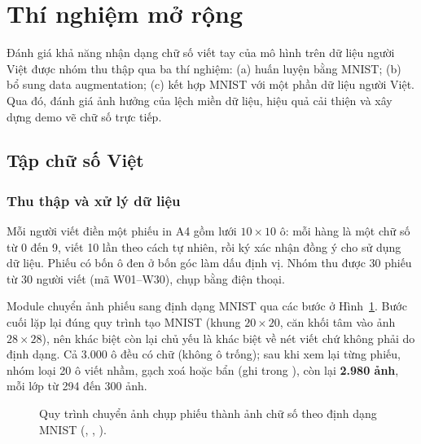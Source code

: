 \section{Thí nghiệm mở rộng}
Đánh giá khả năng nhận dạng chữ số viết tay của mô hình trên dữ liệu người Việt được nhóm thu thập qua ba thí nghiệm: (a) huấn luyện bằng MNIST; (b) bổ sung data augmentation; (c) kết hợp MNIST với một phần dữ liệu người Việt. Qua đó, đánh giá ảnh hưởng của lệch miền dữ liệu, hiệu quả cải thiện và xây dựng demo vẽ chữ số trực tiếp.
\subsection{Tập chữ số Việt}
\subsubsection{Thu thập và xử lý dữ liệu}
Mỗi người viết điền một phiếu in A4 gồm lưới $10\times10$ ô: mỗi hàng là một chữ số từ 0 đến 9, viết 10 lần theo cách tự nhiên, rồi ký xác nhận đồng ý cho sử dụng dữ liệu. Phiếu có bốn ô đen ở bốn góc làm dấu định vị. Nhóm thu được 30 phiếu từ 30 người viết (mã W01--W30), chụp bằng điện thoại.

Module  chuyển ảnh phiếu sang định dạng MNIST qua các bước ở Hình~\ref{fig:vnpipe}. Bước cuối lặp lại đúng quy trình tạo MNIST (khung $20\times20$, căn khối tâm vào ảnh $28\times28$), nên khác biệt còn lại chủ yếu là khác biệt về nét viết chứ không phải do định dạng. Cả 3.000 ô đều có chữ (không ô trống); sau khi xem lại từng phiếu, nhóm loại 20 ô viết nhầm, gạch xoá hoặc bẩn (ghi trong ), còn lại \textbf{2.980 ảnh}, mỗi lớp từ 294 đến 300 ảnh.

\begin{figure}[H]
\centering
{}
\caption{Quy trình chuyển ảnh chụp phiếu thành ảnh chữ số theo định dạng MNIST (, , ).}
\label{fig:vnpipe}
\end{figure}

